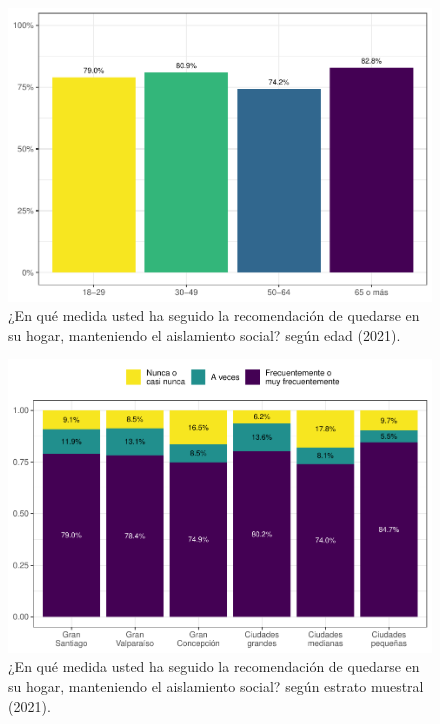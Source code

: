 \documentclass[
  12pt,
  openany]{book}
\begin{document}
\begin{figure}

{\centering \includegraphics{reporte-elsoc_files/figure-latex/dist-edad-1} 

}

\caption{¿En qué medida usted ha seguido la recomendación de quedarse en su hogar, manteniendo el aislamiento social? según edad (2021).}\label{fig:dist-edad}
\end{figure}

\begin{figure}

{\centering \includegraphics{reporte-elsoc_files/figure-latex/dist-estrato-1} 

}

\caption{¿En qué medida usted ha seguido la recomendación de quedarse en su hogar, manteniendo el aislamiento social? según estrato muestral (2021).}\label{fig:dist-estrato}
\end{figure}
\end{document}

